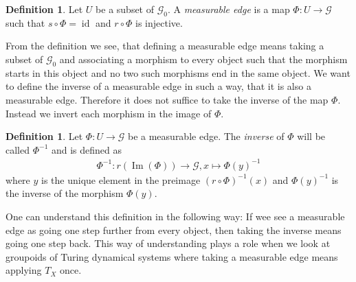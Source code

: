 \documentclass[12pt,a4paper]{scrartcl}
\theoremstyle{plain}
\theoremstyle{definition}
\newtheorem{Definition}[Theorem]{Definition}
\newcommand{\2}{\mathbb{Z} / 2 \mathbb{Z}}
\newcommand{\G}{\mathcal{G}}
\newcommand{\1}{\bar{1}}
\newcommand{\0}{\bar{0}}
\newcommand{\id}{\operatorname{id}}
\newcommand{\Ima}{\operatorname{Im}}
\begin{document}
\begin{Definition}
	Let $U$ be a subset of $\G_0$. A \emph{measurable edge} is a map $\Phi\colon U \to \G$ such that $s \circ \Phi = \id$ and $r \circ \Phi$ is injective.
\end{Definition}
From the definition we see, that defining a measurable edge means taking a subset of $\G_0$ and associating a morphism to every object such that the morphism starts in this object and no two such morphisms end in the same object. We want to define the inverse of a measurable edge in such a way, that it is also a measurable edge. Therefore it does not suffice to take the inverse of the map $\Phi$. Instead we invert each morphism in the image of $\Phi$.
\begin{Definition} \label{inv_meas}
	Let $\Phi\colon U \to \G$ be a measurable edge. The \emph{inverse} of $\Phi$ will be called $\Phi^{-1}$ and is defined as \begin{align*}
		\Phi^{-1}\colon r(\Ima(\Phi)) \to \G, x \mapsto \Phi (y)^{-1}
	\end{align*}
	where $y$ is the unique element in the preimage $(r \circ \Phi)^{-1} (x)$ and $\Phi (y)^{-1}$ is the inverse of the morphism $\Phi (y)$.
\end{Definition}
One can understand this definition in the following way: If wee see a measurable edge as going one step further from every object, then taking the inverse means going one step back. This way of understanding plays a role when we look at groupoids of Turing dynamical systems where taking a measurable edge means applying $T_X$ once.
\end{document}
